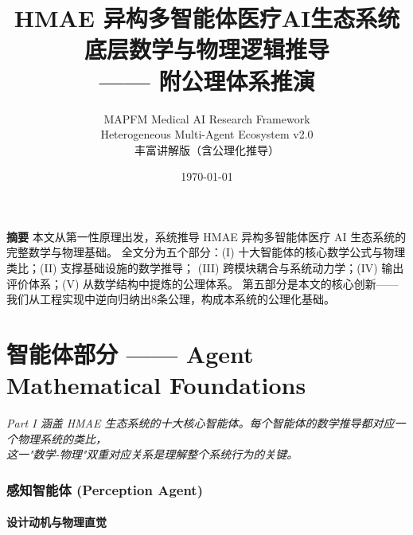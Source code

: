 \documentclass[11pt,a4paper]{ctexart}
\theoremstyle{remark}
\begin{document}
\title{\textbf{HMAE 异构多智能体医疗AI生态系统\\
底层数学与物理逻辑推导\\
—— 附公理体系推演}}
\author{MAPFM Medical AI Research Framework\\[4pt]
\small Heterogeneous Multi-Agent Ecosystem v2.0\\[4pt]
\small 丰富讲解版（含公理化推导）}
\date{\today}
\maketitle

\begin{center}
\small
\textbf{摘要} 本文从第一性原理出发，系统推导 HMAE 异构多智能体医疗 AI 生态系统的完整数学与物理基础。
全文分为五个部分：(I) 十大智能体的核心数学公式与物理类比；(II) 支撑基础设施的数学推导；
(III) 跨模块耦合与系统动力学；(IV) 输出评价体系；(V) 从数学结构中提炼的公理体系。
第五部分是本文的核心创新——我们从工程实现中逆向归纳出8条公理，构成本系统的公理化基础。
\end{center}

\tableofcontents
\newpage

\part{智能体部分 —— Agent Mathematical Foundations}

\vspace{6pt}
\begin{center}
\small
\textit{Part I 涵盖 HMAE 生态系统的十大核心智能体。每个智能体的数学推导都对应一个物理系统的类比，}\\
\textit{这一"数学-物理"双重对应关系是理解整个系统行为的关键。}
\end{center}
\vspace{12pt}

\section{感知智能体 (Perception Agent)}

\subsection{设计动机与物理直觉}
\end{document}
